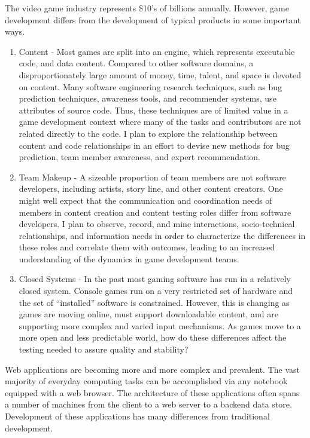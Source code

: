 \documentclass[10pt]{article}
\begin{document}
\begin{small}
The video game industry represents \$10's of billions annually. However, game
development differs from the development of typical products in some important
ways.

\begin{enumerate}

\item Content - Most games are split into an engine, which represents executable code,
    and data content. Compared to other software domains, a disproportionately large
    amount of money, time, talent, and space is devoted on content.  
    Many software engineering research techniques, such as
    bug prediction techniques, awareness tools, and recommender systems, use attributes
    of source code. Thus, these techniques are of limited value
    in a game development context where many of the tasks and contributors are
    not related directly to the code. I plan to explore the relationship between content
    and code relationships in an effort to devise new
    methods for bug prediction, team member awareness, and expert recommendation.

\item Team Makeup - A sizeable proportion of team members
    are not software developers, including artists, story line, and other content creators.
    One might well expect that the communication and coordination needs of members
    in content creation and content testing roles differ from software developers.  I plan to observe, record, and mine
    interactions, socio-technical relationships, and information 
    needs in order to characterize the differences in these roles
    and correlate them with outcomes, leading 
    to an increased understanding of the dynamics in game development teams.

\item Closed Systems - In the past most gaming software has run in a relatively closed
    system. Console games run on a very restricted set of hardware and the set of ``installed''
    software is constrained.  However, this is changing as games are moving online,
    must support downloadable content, and are supporting more complex and varied input 
    mechanisms.  As games move to a more open and less predictable world,
    how do these differences affect the testing needed to assure quality and stability?  

\end{enumerate}

Web applications are becoming more and more complex and prevalent.  The vast
majority of everyday computing tasks can be accomplished via any notebook
equipped with a web browser.  The architecture of these applications often spans a number of
machines from the client to a web server to a backend data store.  Development of these
applications has many differences from traditional development.


\end{small}
\end{document}
